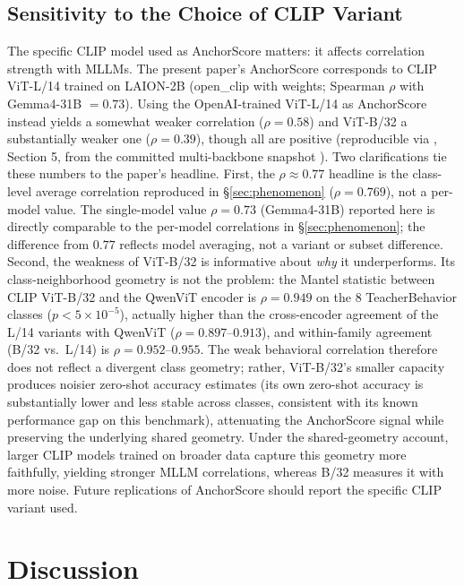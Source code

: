 \documentclass[a4paper,fleqn]{cas-sc}
\begin{document}
\subsection{Sensitivity to the Choice of CLIP Variant}
\label{sec:sensitivity}
The specific CLIP model used as AnchorScore matters: it affects correlation strength with MLLMs. The present paper's AnchorScore corresponds to CLIP ViT-L/14 trained on LAION-2B (open\_clip with  weights; Spearman $\rho$ with Gemma4-31B $=0.73$). Using the OpenAI-trained ViT-L/14 as AnchorScore instead yields a somewhat weaker correlation ($\rho=0.58$) and ViT-B/32 a substantially weaker one ($\rho=0.39$), though all are positive (reproducible via , Section 5, from the committed multi-backbone snapshot ).
 Two clarifications tie these numbers to the paper's headline. First, the $\rho\approx0.77$ headline \cite{ma2025anchorscore} is the class-level average correlation reproduced in \S\ref{sec:phenomenon} ($\rho=0.769$), not a per-model value. The single-model value $\rho=0.73$ (Gemma4-31B) reported here is directly comparable to the per-model correlations in \S\ref{sec:phenomenon}; the difference from $0.77$ reflects model averaging, not a variant or subset difference.
 Second, the weakness of ViT-B/32 is informative about \emph{why} it underperforms. Its class-neighborhood geometry is not the problem: the Mantel statistic between CLIP ViT-B/32 and the QwenViT encoder is $\rho=0.949$ on the 8 TeacherBehavior classes ($p<5\times10^{-5}$), actually higher than the cross-encoder agreement of the L/14 variants with QwenViT ($\rho=0.897$--$0.913$), and within-family agreement (B/32 vs.\ L/14) is $\rho=0.952$--$0.955$. The weak behavioral correlation therefore does not reflect a divergent class geometry; rather, ViT-B/32's smaller capacity produces noisier zero-shot accuracy estimates (its own zero-shot accuracy is substantially lower and less stable across classes, consistent with its known performance gap on this benchmark), attenuating the AnchorScore signal while preserving the underlying shared geometry. Under the shared-geometry account, larger CLIP models trained on broader data capture this geometry more faithfully, yielding stronger MLLM correlations, whereas B/32 measures it with more noise. Future replications of AnchorScore should report the specific CLIP variant used.

\section{Discussion}
\label{sec:discussion}
\end{document}
